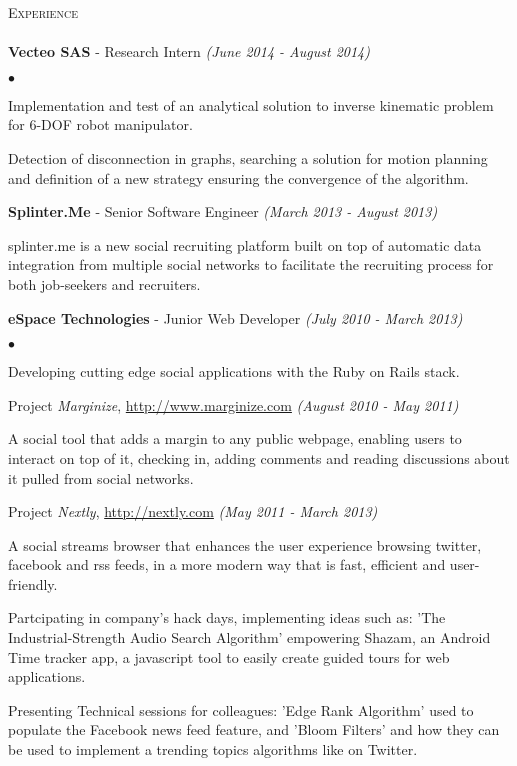 \documentclass[letterpaper,12pt]{article}
\newcommand{\lineunder}{\vspace*{-8pt} \\ \hspace*{-8pt} \hrulefill \\}
\newcommand{\interval}[1]{\textit{(#1)} }
\newcommand{\header}[1]{{\hspace*{0pt}\vspace*{6pt} \textsc{#1}} \vspace*{-6pt} \lineunder}
\newcommand{\employer}[3]{{\textbf{#1} - {#3} \interval{#2}\\ }}
\newenvironment{achievements}{\begin{list}{$\bullet$}{\topsep 0pt \itemsep -2pt}}{\vspace*{4pt}\end{list}}
\newenvironment{details}{\vspace*{-4pt} \begin{list}{\topsep 0pt \itemsep -2pt}}{\vspace*{4pt}\end{list}}
\begin{document}
\header{Experience}
\employer{Vecteo SAS}{June 2014 - August 2014}{Research Intern}
  \begin{achievements}
    \item Implementation and test of an analytical solution to inverse kinematic problem for 6-DOF robot manipulator.
    \item Detection of disconnection in graphs, searching a solution for motion planning and definition of a new strategy ensuring the convergence of the algorithm.
  \end{achievements}
\employer{Splinter.Me}{March 2013 - August 2013}{Senior Software Engineer}
  \begin{details}
    \item splinter.me is a new social recruiting platform built on top of automatic data integration from multiple social networks to facilitate the recruiting process for both job-seekers and recruiters.
  \end{details}
\employer{eSpace Technologies}{July 2010 - March 2013}{Junior Web Developer}
  \begin{achievements}
    \item Developing cutting edge social applications with the Ruby on Rails stack.
    \item Project \textit{Marginize}, \url{http://www.marginize.com} \interval{August 2010 - May 2011}
    \begin{details}
      \item A social tool that adds a margin to any public webpage, enabling users to interact on top of it, checking in, adding comments and reading discussions about it pulled from social networks. 
    \end{details}
    \item Project \textit{Nextly}, \url{http://nextly.com} \interval{May 2011 - March 2013}
    \begin{details}
      \item A social streams browser that enhances the user experience browsing twitter, facebook and rss feeds, in a more modern way that is fast, efficient and user-friendly. 
    \end{details}
    \item Partcipating in company's hack days, implementing ideas such as: 'The Industrial-Strength Audio Search Algorithm' empowering Shazam, an Android Time tracker app, a javascript tool to easily create guided tours for web applications.
    \item Presenting Technical sessions for colleagues: 'Edge Rank Algorithm' used to populate the Facebook news feed feature, and 'Bloom Filters' and how they can be used to implement a trending topics algorithms like on Twitter.
  \end{achievements}
\end{document}
